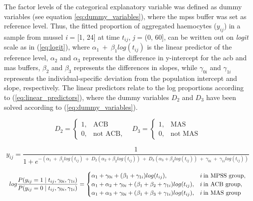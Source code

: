 The factor levels of the categorical explanatory variable was defined as dummy variables (see equation \ref{eq:dummy_variables}), where the \acrshort{mpss} buffer was set as reference level. Thus, the fitted proportion of aggregated haemocytes ($y_{ij}$) in a sample from mussel \emph{i} = [1, 24] at time $t_{ij}$, \emph{j} = (0, 60], can be written out on \emph{logit} scale as in (\ref{eq:logit}), where $\alpha_{1} \: + \: \beta_{1}log(t_{ij})$ is the linear predictor of the reference level, $\alpha_{2}$ and $\alpha_{3}$ represents the difference in y-intercept for the \acrshort{acb} and \acrshort{mas} buffers, $\beta_{2}$ and $\beta_{3}$ represents the differences in slopes, while $\gamma_{0i}$ and $\gamma_{1i}$ represents the individual-specific deviation from the population intercept and slope, respectively. The linear predictors relate to the log proportions according to (\ref{eq:linear_predictors}), where the dummy variables $D_{2}$ and $D_{3}$ have been solved according to (\ref{eq:dummy_variables}).

\begin{equation}
    \label{eq:dummy_variables}
D_{2} =\begin{cases}
      1, & \text{ACB}\\
      0, & \text{not ACB},
    \end{cases}
    \quad
D_{3} =\begin{cases}
      1, & \text{MAS}\\
      0, & \text{not MAS}
    \end{cases}
\end{equation}

\begin{equation}
\label{eq:logit}
y_{ij} = \dfrac{1}{1 + e^{-(\alpha_{1} \: + \: \beta_{1} log(t_{ij}) \: + \: D_{2}(\alpha_{2} + \beta_{2}log(t_{ij})) \: + \:  D_{3}(\alpha_{3} + \beta_{3}log(t_{ij})) \: + \: \gamma_{0i} \: + \: \gamma_{1i}log(t_{ij}))}}
\end{equation}

\begin{equation}
    \label{eq:linear_predictors}
    \resizebox{\linewidth}{!}{$
    log\dfrac{P(y_{ij} = 1 \mid t_{ij}, \gamma_{0i}, \gamma_{1i})}{P(y_{ij} = 0 \mid t_{ij}, \gamma_{0i}, \gamma_{1i})} = \begin{cases}
        \alpha_{1} + \gamma_{0i} + (\beta_{1} + \gamma_{1i})log(t_{ij}), & i \: \text{in MPSS group}, \\
        \alpha_{1} + \alpha_{2} + \gamma_{0i} + (\beta_{1} + \beta_{2} + \gamma_{1i})log(t_{ij}), & i \: \text{in ACB group}, \\
        \alpha_{1} + \alpha_{3} + \gamma_{0i} + (\beta_{1} + \beta_{3} + \gamma_{1i})log(t_{ij}), & i \: \text{in MAS group} \\
    \end{cases}
    $}
\end{equation}

